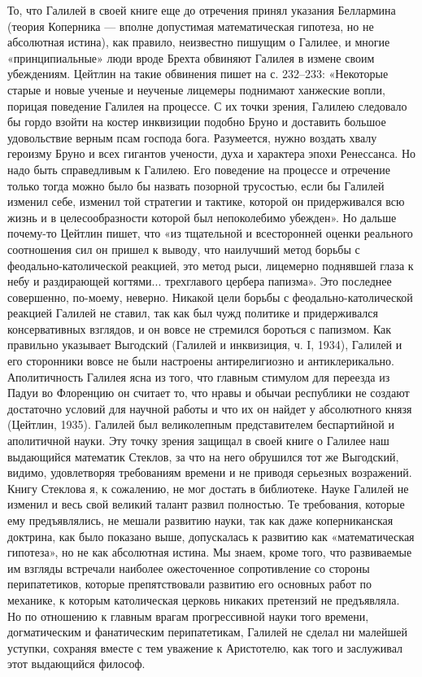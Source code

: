 То,  что  Галилей в  своей  книге  еще  до отречения  принял  указания
Беллармина  (теория  Коперника  --- вполне  допустимая  математическая
гипотеза, но не абсолютная истина),  как правило, неизвестно пишущим о
Галилее, и многие «принципиальные»  люди вроде Брехта обвиняют Галилея
в  измене своим  убеждениям. Цейтлин  на такие  обвинения пишет  на с.
232--233:  «Некоторые  старые  и  новые  ученые  и  неученые  лицемеры
поднимают ханжеские вопли, порицая поведение Галилея на процессе. С их
точки зрения, Галилею  следовало бы гордо взойти  на костер инквизиции
подобно  Бруно и  доставить большое  удовольствие верным  псам господа
бога. Разумеется, нужно  воздать хвалу героизму Бруно  и всех гигантов
учености, духа и характера эпохи Ренессанса. Но надо быть справедливым
к Галилею.  Его поведение на  процессе и отречение только  тогда можно
было  бы назвать  позорной трусостью,  если бы  Галилей изменил  себе,
изменил той стратегии и тактике,  которой он придерживался всю жизнь и
в  целесообразности  которой  был  непоколебимо  убежден».  Но  дальше
почему-то  Цейтлин пишет,  что  «из тщательной  и всесторонней  оценки
реального  соотношения сил  он пришел  к выводу,  что наилучший  метод
борьбы с  феодально-католической реакцией,  это метод  рыси, лицемерно
поднявшей глаза  к небу  и раздирающей когтями...  трехглавого цербера
папизма». Это  последнее совершенно,  по-моему, неверно.  Никакой цели
борьбы с  феодально-католической реакцией  Галилей не ставил,  так как
был чужд политике и придерживался  консервативных взглядов, и он вовсе
не стремился  бороться с  папизмом. Как правильно  указывает Выгодский
(Галилей и инквизиция, ч. I, 1934),  Галилей и его сторонники вовсе не
были настроены антирелигиозно и антиклерикально. Аполитичность Галилея
ясна из того, что главным стимулом  для переезда из Падуи во Флоренцию
он считает  то, что  нравы и обычаи  республики не  создают достаточно
условий для  научной работы  и что  их он  найдет у  абсолютного князя
(Цейтлин, 1935). Галилей  был великолепным представителем беспартийной
и аполитичной науки. Эту точку зрения  защищал в своей книге о Галилее
наш  выдающийся математик  Стеклов, за  что на  него обрушился  тот же
Выгодский,  видимо,  удовлетворяя  требованиям времени  и  не  приводя
серьезных возражений. Книгу Стеклова я,  к сожалению, не мог достать в
библиотеке.  Науке  Галилей не  изменил  и  весь свой  великий  талант
развил полностью. Те требования,  которые ему предъявлялись, не мешали
развитию  науки,  так  как  даже  коперниканская  доктрина,  как  было
показано выше,  допускалась к развитию как  «математическая гипотеза»,
но не как абсолютная истина. Мы  знаем, кроме того, что развиваемые им
взгляды  встречали  наиболее  ожесточенное  сопротивление  со  стороны
перипатетиков,  которые  препятствовали  развитию его  основных  работ
по  механике,  к которым  католическая  церковь  никаких претензий  не
предъявляла. Но по отношению к главным врагам прогрессивной науки того
времени, догматическим и фанатическим перипатетикам, Галилей не сделал
ни малейшей уступки, сохраняя вместе  с тем уважение к Аристотелю, как
того и заслуживал этот выдающийся философ.

